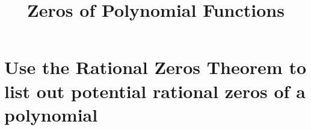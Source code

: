 \documentclass[t,usenames,dvipsnames]{beamer}
\title{Zeros of Polynomial Functions}
\author{}
\date{}
\begin{document}
\begin{frame}
    \maketitle
\end{frame}

\section{Use the Rational Zeros Theorem to list out potential rational zeros of a polynomial}




\end{document}
